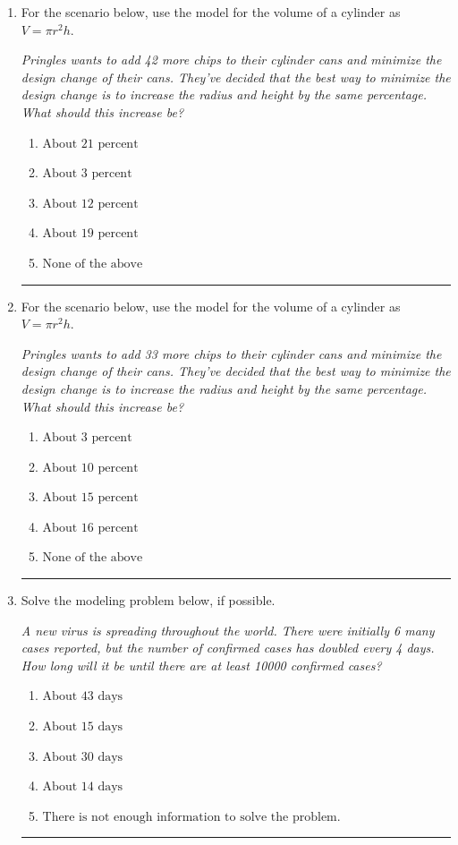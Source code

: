 \documentclass[14pt]{extbook}
\newcommand{\litem}[1]{\item#1\hspace*{-1cm}\rule{\textwidth}{0.4pt}}
\begin{document}
\begin{enumerate}
\litem{
For the scenario below, use the model for the volume of a cylinder as $V = \pi r^2 h$.
\begin{center}
    \textit{ Pringles wants to add 42 \text{percent} more chips to their cylinder cans and minimize the design change of their cans. They've decided that the best way to minimize the design change is to increase the radius and height by the same percentage. What should this increase be? }
\end{center}
\begin{enumerate}[label=\Alph*.]
\item \( \text{About } 21 \text{ percent} \)
\item \( \text{About } 3 \text{ percent} \)
\item \( \text{About } 12 \text{ percent} \)
\item \( \text{About } 19  \)
\item \( \text{None of the above} \)

\end{enumerate} }
\litem{
For the scenario below, use the model for the volume of a cylinder as $V = \pi r^2 h$.
\begin{center}
    \textit{ Pringles wants to add 33 \text{percent} more chips to their cylinder cans and minimize the design change of their cans. They've decided that the best way to minimize the design change is to increase the radius and height by the same percentage. What should this increase be? }
\end{center}
\begin{enumerate}[label=\Alph*.]
\item \( \text{About } 3 \text{ percent} \)
\item \( \text{About } 10 \text{ percent} \)
\item \( \text{About } 15 \text{ percent} \)
\item \( \text{About } 16 \text{ percent} \)
\item \( \text{None of the above} \)

\end{enumerate} }
\litem{
Solve the modeling problem below, if possible.
\begin{center}
    \textit{ A new virus is spreading throughout the world. There were initially 6 many cases reported, but the number of confirmed cases has doubled every 4 days. How long will it be until there are at least 10000 confirmed cases? }
\end{center}
\begin{enumerate}[label=\Alph*.]
\item \( \text{About } 43 \text{ days} \)
\item \( \text{About } 15 \text{ days} \)
\item \( \text{About } 30 \text{ days} \)
\item \( \text{About } 14 \text{ days} \)
\item \( \text{There is not enough information to solve the problem.} \)


\end{enumerate}}
\end{enumerate}
\end{document}
